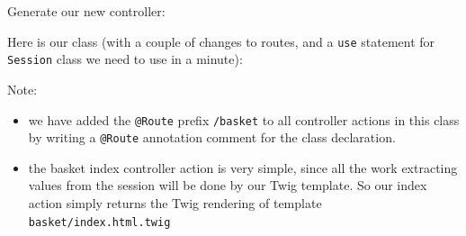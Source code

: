 \documentclass[a4paperpaper,openright]{book}
\newenvironment{Shaded}{}{}
\newcommand{\AnnotationTok}[1]{\textcolor[rgb]{0.38,0.63,0.69}{\textbf{\textit{#1}}}}
\newcommand{\CommentTok}[1]{\textcolor[rgb]{0.38,0.63,0.69}{\textit{#1}}}
\newcommand{\ExtensionTok}[1]{#1}
\newcommand{\KeywordTok}[1]{\textcolor[rgb]{0.00,0.44,0.13}{\textbf{#1}}}
\newcommand{\NormalTok}[1]{#1}
\newcommand{\OtherTok}[1]{\textcolor[rgb]{0.00,0.44,0.13}{#1}}
\newcommand{\StringTok}[1]{\textcolor[rgb]{0.25,0.44,0.63}{#1}}
\begin{document}
Generate our new controller:

\begin{Shaded}
\end{Shaded}

Here is our class (with a couple of changes to routes, and a
\texttt{use} statement for \texttt{Session} class we need to use in a
minute):

\begin{Shaded}
\end{Shaded}

Note:

\begin{itemize}
\item
  we have added the \texttt{@Route} prefix \texttt{/basket} to all
  controller actions in this class by writing a \texttt{@Route}
  annotation comment for the class declaration.
\item
  the basket index controller action is very simple, since all the work
  extracting values from the session will be done by our Twig template.
  So our index action simply returns the Twig rendering of template
  \texttt{basket/index.html.twig}
\end{itemize}
\end{document}
